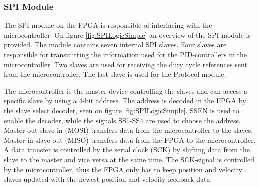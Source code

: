 \documentclass[../../main.tex]{subfiles}
\begin{document}







\subsubsection*{SPI Module}

The SPI module on the FPGA is responsible of interfacing with the microcontroller. On figure \ref{fig:SPILogicSimple} an overview of the SPI module is provided. The module contains seven internal SPI slaves. Four slaves are responsible for transmitting the information used for the PID-controllers in the microcontroller. Two slaves are used for receiving the duty cycle references sent from the microcontroller. The last slave is used for the Protocol module.

The microcontroller is the master device controlling the slaves and can access a specific slave by using a 4-bit address. The address is decoded in the FPGA by the slave select decoder, seen on figure \ref{fig:SPILogicSimple}. SSEN is used to enable the decoder, while the signals SS1-SS4 are used to choose the address. Master-out-slave-in (MOSI) transfers data from the microcontroller to the slaves. Master-in-slave-out (MISO) transfers data from the FPGA to the microcontroller. A data transfer is controlled by the serial clock (SCK) by shifting data from the slave to the master and vice versa at the same time. The SCK-signal is controlled by the microcontroller, thus the FPGA only has to keep position and velocity slaves updated with the newest position and velocity feedback data. 
\end{document}
